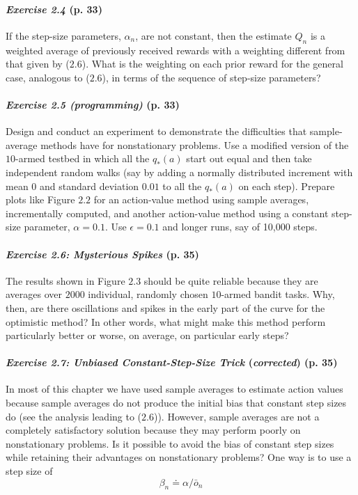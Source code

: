 \documentclass[10pt,a4paper]{article}
\begin{document}
\paragraph{\textit{Exercise 2.4} (p. 33)} If the step-size parameters, $\alpha_n$, are not constant, then the estimate $Q_n$ is
a weighted average of previously received rewards with a weighting different from that
given by ($2.6$). What is the weighting on each prior reward for the general case, analogous
to ($2.6$), in terms of the sequence of step-size parameters?

\paragraph{\textit{Exercise 2.5 (programming)} (p. 33)} Design and conduct an experiment to demonstrate the
difficulties that sample-average methods have for nonstationary problems. Use a modified version of the $10$-armed testbed in which all the $q_*(a)$ start out equal and then take independent random walks (say by adding a normally distributed increment with mean $0$ and standard deviation $0.01$ to all the $q_*(a)$ on each step). Prepare plots like Figure $2.2$
for an action-value method using sample averages, incrementally computed, and another action-value method using a constant step-size parameter, $\alpha = 0.1$. Use $\epsilon = 0.1$ and
longer runs, say of 10,000 steps.

\paragraph{\textit{Exercise 2.6: Mysterious Spikes} (p. 35)} The results shown in Figure $2.3$ should be quite reliable because they are averages over $2000$ individual, randomly chosen $10$-armed bandit tasks.
Why, then, are there oscillations and spikes in the early part of the curve for the optimistic method? In other words, what might make this method perform particularly better or worse, on average, on particular early steps?

\paragraph{\textit{Exercise 2.7: Unbiased Constant-Step-Size Trick} (\textit{corrected}) (p. 35)} In most of this chapter we have used
sample averages to estimate action values because sample averages do not produce the
initial bias that constant step sizes do (see the analysis leading to ($2.6$)). However, sample averages are not a completely satisfactory solution because they may perform poorly on nonstationary problems. Is it possible to avoid the bias of constant step sizes while retaining their advantages on nonstationary problems? One way is to use a step size of
\begin{equation}
\beta_n \doteq \alpha/\bar{o}_n
\end{equation}
\end{document}
